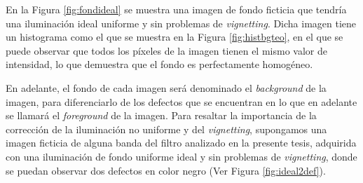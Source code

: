 En la Figura \ref{fig:fondideal} se muestra una imagen de fondo ficticia que tendría una iluminación ideal uniforme y sin problemas de  \textit{vignetting}. Dicha imagen tiene un histograma como el que se muestra en la Figura \ref{fig:histbgteo}, en el que se puede observar que todos los píxeles de la imagen tienen el mismo valor de intensidad, lo que demuestra que el fondo es perfectamente homogéneo.
	\begin{figure}[H]
		\begin{floatrow}
		\end{floatrow}
	\end{figure}
En adelante, el fondo de cada imagen será denominado el \textit{background} de la imagen, para diferenciarlo de los defectos que se encuentran en lo que en adelante se llamará el \textit{foreground} de la imagen. Para resaltar la importancia de la corrección de la iluminación no uniforme y del \textit{vignetting}, supongamos una imagen ficticia de alguna banda del filtro analizado en la presente tesis, adquirida con una iluminación de fondo uniforme ideal y sin problemas de \textit{vignetting}, donde se puedan observar dos defectos en color negro (Ver Figura \ref{fig:ideal2def}).
